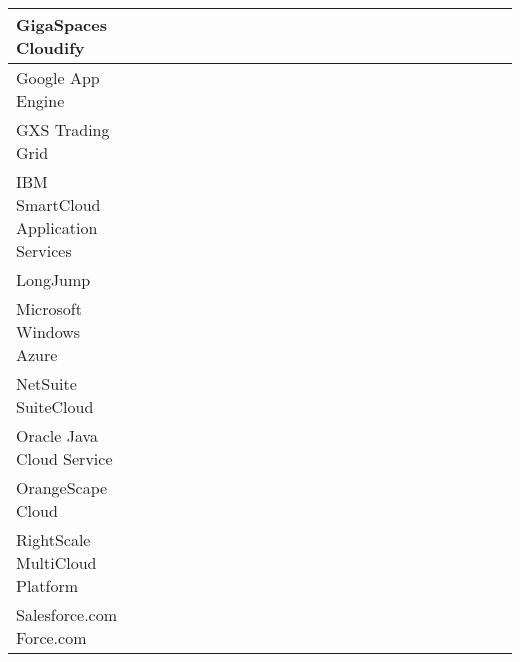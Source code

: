 \begin{longtable}{IL{7.5em}IC{.2cm}|C{.2cm}|C{.2cm}|C{.2cm}IC{.2cm}|C{.2cm}|C{.2cm}|C{.2cm}|C{.2cm}IC{.2cm}|C{.2cm}|C{.2cm}IC{.2cm}|C{.2cm}|C{.2cm}|C{.2cm}|C{.2cm}|C{.2cm}I}
GigaSpaces Cloudify &
	 & & & 
	& & & & & 
	& & & 
	& & & & & & \\\hline

Google App Engine &
	 & & & 
	& & & & & 
	& & & 
	& & & & & & \\\hline

GXS Trading Grid &
	 & & & 
	& & & & & 
	& & & 
	& & & & & & \\\hline

IBM SmartCloud Application Services &
	 & & & 
	& & & & & 
	& & & 
	& & & & & & \\\hline

LongJump &
	 & & & 
	& & & & & 
	& & & 
	& & & & & & \\\hline

Microsoft Windows Azure &
	 & & & 
	& & & & & 
	& & & 
	& & & & & & \\\hline

NetSuite SuiteCloud &
	 & & & 
	& & & & & 
	& & & 
	& & & & & & \\\hline

Oracle Java Cloud Service &
	 & & & 
	& & & & & 
	& & & 
	& & & & & & \\\hline

OrangeScape Cloud &
	 & & & 
	& & & & & 
	& & & 
	& & & & & & \\\hline

RightScale MultiCloud Platform &
	 & & & 
	& & & & & 
	& & & 
	& & & & & & \\\hline

Salesforce.com Force.com &
	 & & & 
	& & & & & 
	& & & 
	& & & & & & \\\hline


\end{longtable}
